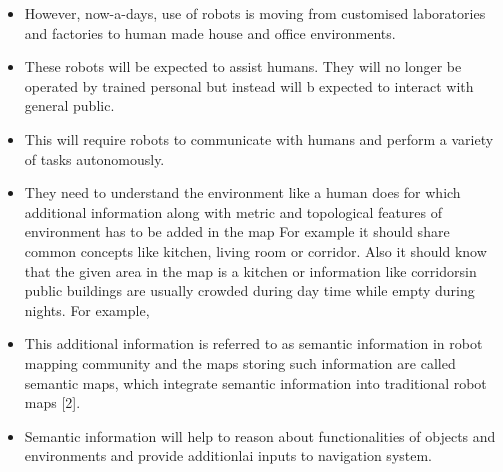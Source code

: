\begin{itemize}
 \item However, now-a-days, use of robots is moving from customised laboratories and factories to human made house and office environments.
 \item These robots will be expected to assist humans. They will no longer be operated by trained personal but instead will b expected to interact with general public.
 \item This will require robots to communicate with humans and perform a variety of tasks autonomously.
 \item They need to understand the environment like a human does for which additional information along with metric and topological features of environment has to be added in the map For example it should share common concepts like kitchen, living room or corridor. Also it should know that the given area in the map is a kitchen or information like corridorsin public buildings are usually crowded during day time while empty during nights. For example,  
 \item This additional information is referred to as semantic information in robot mapping community and the maps storing such information are called semantic maps, which integrate semantic information into traditional robot maps [2].
 \item Semantic information will help to reason about functionalities of objects and environments and provide additionlai inputs to navigation system.
 \end{itemize}




